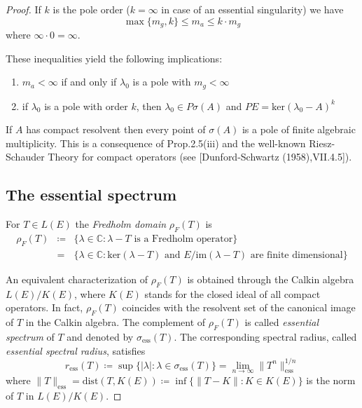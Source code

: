 \begin{proof}
If $k$ is the pole order ($k = \infty$ in case of an essential singularity) we have
\begin{equation}\label{eq:a3-3.4}
	\max\{m_{g},k\} \leq m_{a} \leq k \cdot m_{g}
\end{equation}
where $\infty \cdot 0 = \infty$.

These inequalities yield the following implications:
\begin{enumerate}[-]
	\item  
	$m_{a} < \infty$ if and only if $\lambda_{0}$ is a pole with $m_{g} < \infty$
	\item 
	if $\lambda_{0}$ is a pole with order $k$, then $\lambda_{0} \in P\sigma(A)$ and $PE = \text{ker}(\lambda_{0} - A)^{k}$
\end{enumerate}

If $A$ has compact resolvent then every point of $\sigma(A)$ is a pole of finite algebraic multiplicity.
This is a consequence of Prop.2.5(iii) and the well-known Riesz-Schauder Theory for compact operators (see [Dunford-Schwartz (1958),VII.4.5]).

\subsection{The essential spectrum}\label{subsec:a3-3.7}

For $T \in L(E)$ the \emph{Fredholm domain} $\rho_{F}(T)$ is
\begin{eqnarray}\label{eq:a3-3.5}
	\rho_{F}(T) & \coloneqq & \{\lambda \in \mathbb{C} \colon \lambda - T \text{ is a Fredholm operator}\}\\
	& = & \{\lambda \in \mathbb{C} \colon \text{ker}(\lambda - T) \text{ and } E/\text{im}(\lambda - T) \text{ are finite dimensional}\}
\end{eqnarray}

An equivalent characterization of $\rho_{F}(T)$ is obtained through the Calkin algebra $L(E)/K(E)$, where $K(E)$ stands for the closed ideal of all compact operators.
In fact, $\rho_{F}(T)$ coincides with the resolvent set of the canonical image of $T$ in the Calkin algebra.
The complement of $\rho_{F}(T)$ is called \emph{essential spectrum} of $T$ and denoted by $\sigma_{\text{ess}}(T)$.
The corresponding spectral radius, called \emph{essential spectral radius}, satisfies
\begin{equation}\label{eq:a3-3.6}
	r_{\text{ess}}(T) \coloneqq \sup \{|\lambda| \colon \lambda \in \sigma_{\text{ess}}(T)\} = \lim_{n \to \infty} \|T^{n}\|_{\text{ess}}^{1/n}
\end{equation}
where $\|T\|_{\text{ess}} = \text{dist}(T,K(E)) \coloneqq \inf \{\|T - K\| \colon K \in K(E)\}$ is the norm of $T$ in $L(E)/K(E)$.


\end{proof}
